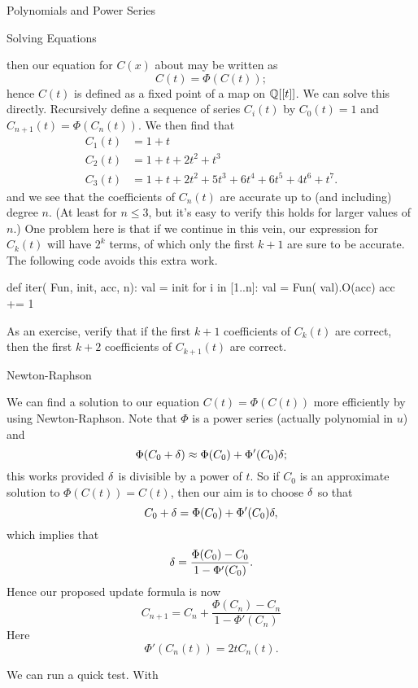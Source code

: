 \begin{chap}{Polynomials and Power Series}
\begin{sect}{Solving Equations}
\begin{para}
\[\]
then our equation for $C(x)$ about may be written as
\[
    C(t) = \Phi(C(t));
\]
hence $C(t)$ is defined as a fixed point of a map on ${\mathbb Q}[[t]]$.
We can solve this directly. Recursively define a sequence of series $C_i(t)$ 
by $C_0(t)=1$ and $C_{n+1}(t) =\Phi(C_n(t))$.
We then find that
%
\begin{align*}
    C_1(t) &= 1 + t\\
    C_2(t) &= 1 + t + 2t^2 + t^3\\
    C_3(t) &= 1 + t + 2t^{2} + 5t^{3} + 6t^{4} + 6t^{5} + 4t^{6} + t^{7}.
\end{align*}
%
and we see that the coefficients of $C_n(t)$ are accurate up to 
(and including) degree $n$. (At least for $n\le3$, but it's easy to 
verify this holds for larger values of $n$.) One problem
here is that if we continue in this vein, our expression for $C_k(t)$
will have $2^k$ terms, of which only the first $k+1$ are sure to be accurate.
The following code avoids this extra work.
\end{para}
%
\begin{sagecode}
\begin{sageinput}
def iter( Fun, init, acc, n):
    val = init
    for i in [1..n]:
        val = Fun( val).O(acc)
        acc += 1
\end{sageinput}
\end{sagecode}
%
\begin{para}
As an exercise, verify that if the first $k+1$ coefficients of $C_k(t)$
are correct, then the first $k+2$ coefficients of $C_{k+1}(t)$ are correct.
\end{para}
%
\end{sect}
%
\begin{sect}{Newton-Raphson}
%
\begin{para}
We can find a solution to our equation $C(t) =\Phi(C(t))$ more efficiently by
using Newton-Raphson. Note that $\Phi$ is a power series (actually polynomial in $u$)
and
\[
    \Phi(C_0+\delta) \approx \Phi(C_0) +\Phi'(C_0)\delta;
\]
this works provided $\delta$ is divisible by a power of $t$.
So if $C_0$ is an approximate solution to $\Phi(C(t))=C(t)$, then our aim is to 
choose $\delta$ so that
\[
    C_0 + \delta = \Phi(C_0) +\Phi'(C_0)\delta,
\]
which implies that
\[
    \delta = \frac{\Phi(C_0)-C_0}{1-\Phi'(C_0)}.
\]
Hence our proposed update formula is now
\[
    C_{n+1} = C_n + \frac{\Phi(C_n)-C_n}{1-\Phi'(C_n)}
\]
Here
\[
    \Phi'(C_n(t)) = 2tC_n(t).
\]
\end{para}
%
\begin{para}
We can run a quick test. With

\end{para}
\end{sect}
\end{chap}
